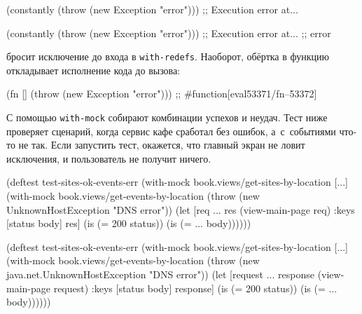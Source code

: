\ifx\DEVICETYPE\MOBILE

\begin{english}
  \begin{clojure}
(constantly
  (throw (new Exception "error")))
;; Execution error at...
  \end{clojure}
\end{english}

\else

\begin{english}
  \begin{clojure}
(constantly (throw (new Exception "error")))
;; Execution error at...
;; error
  \end{clojure}
\end{english}

\fi


\noindent
бросит исключение до входа в \verb|with-redefs|. Наоборот, обёртка в
функцию откладывает исполнение кода до вызова:

\begin{english}
  \begin{clojure}
(fn [] (throw (new Exception "error")))
;; #function[eval53371/fn--53372]
  \end{clojure}
\end{english}

С помощью \verb|with-mock| собирают комбинации успехов и неудач. Тест ниже
проверяет сценарий, когда сервис кафе сработал без ошибок, а~с~событиями что-то
не так. Если запустить тест, окажется, что главный экран не ловит исключения, и
пользователь не получит ничего.

\ifx\DEVICETYPE\MOBILE

\begin{english}
  \begin{clojure/lines}
(deftest test-sites-ok-events-err
  (with-mock
    book.views/get-sites-by-location
    [...]
    (with-mock
     book.views/get-events-by-location
     (throw
      (new UnknownHostException
        "DNS error"))
     (let [req {...}
           res (view-main-page req)
           {:keys [status body]} res]
       (is (= 200 status))
       (is (= {...} body))))))
  \end{clojure/lines}
\end{english}

\else

\begin{english}
  \begin{clojure/lines}
(deftest test-sites-ok-events-err
  (with-mock book.views/get-sites-by-location [...]
    (with-mock book.views/get-events-by-location
      (throw (new java.net.UnknownHostException "DNS error"))
      (let [request {...}
            response (view-main-page request)
            {:keys [status body]} response]
        (is (= 200 status))
        (is (= {...} body))))))
  \end{clojure/lines}
\end{english}

